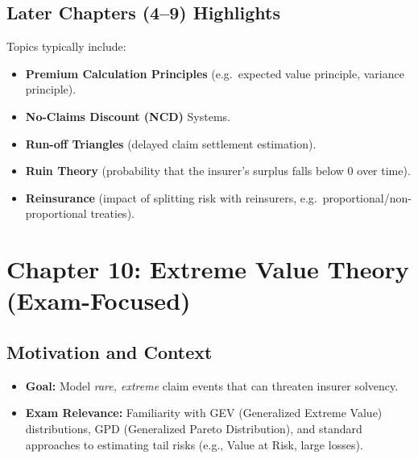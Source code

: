 \documentclass[13pt,a4paper]{article}
\begin{document}
\subsection{Later Chapters (4--9) Highlights}
Topics typically include:
\begin{itemize}
  \item \textbf{Premium Calculation Principles} (e.g.\ expected value principle, variance principle).
  \item \textbf{No-Claims Discount (NCD)} Systems.
  \item \textbf{Run-off Triangles} (delayed claim settlement estimation).
  \item \textbf{Ruin Theory} (probability that the insurer's surplus falls below 0 over time).
  \item \textbf{Reinsurance} (impact of splitting risk with reinsurers, e.g.\ proportional/non-proportional treaties).
\end{itemize}

\section{Chapter 10: Extreme Value Theory (Exam-Focused)}
\label{sec:chapter10}

\subsection{Motivation and Context}
\begin{itemize}
  \item \textbf{Goal:} Model \emph{rare, extreme} claim events that can threaten insurer solvency.
  \item \textbf{Exam Relevance:} Familiarity with GEV (Generalized Extreme Value) distributions, GPD (Generalized Pareto Distribution), and standard approaches to estimating tail risks (e.g., Value at Risk, large losses).
\end{itemize}
\end{document}
